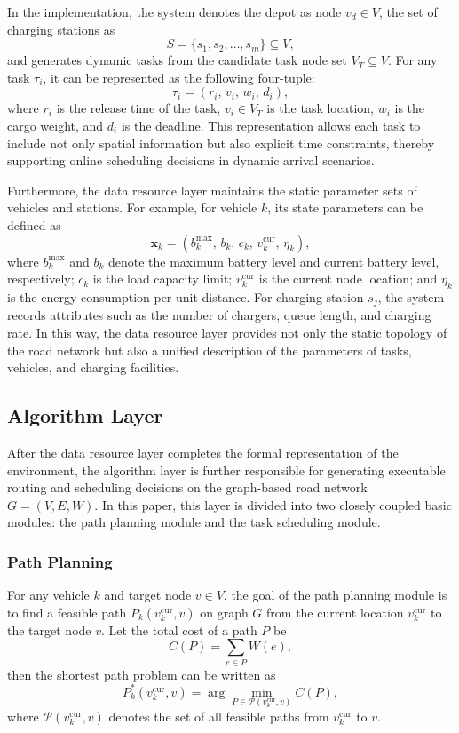 In the implementation, the system denotes the depot as node \(v_d\in V\), the set of charging stations as
\[
S=\{s_1,s_2,\dots,s_m\}\subseteq V,
\]
and generates dynamic tasks from the candidate task node set \(V_T\subseteq V\). For any task \(\tau_i\), it can be represented as the following four-tuple:
\[
\tau_i=(r_i,\, v_i,\, w_i,\, d_i),
\]
where \(r_i\) is the release time of the task, \(v_i\in V_T\) is the task location, \(w_i\) is the cargo weight, and \(d_i\) is the deadline. This representation allows each task to include not only spatial information but also explicit time constraints, thereby supporting online scheduling decisions in dynamic arrival scenarios.

Furthermore, the data resource layer maintains the static parameter sets of vehicles and stations. For example, for vehicle \(k\), its state parameters can be defined as
\[
\mathbf{x}_k=(b_k^{\max},\, b_k,\, c_k,\, v_k^{\text{cur}},\, \eta_k),
\]
where \(b_k^{\max}\) and \(b_k\) denote the maximum battery level and current battery level, respectively; \(c_k\) is the load capacity limit; \(v_k^{\text{cur}}\) is the current node location; and \(\eta_k\) is the energy consumption per unit distance. For charging station \(s_j\), the system records attributes such as the number of chargers, queue length, and charging rate. In this way, the data resource layer provides not only the static topology of the road network but also a unified description of the parameters of tasks, vehicles, and charging facilities.



\subsection{Algorithm Layer}
After the data resource layer completes the formal representation of the environment, the algorithm layer is further responsible for generating executable routing and scheduling decisions on the graph-based road network \(G=(V,E,W)\). In this paper, this layer is divided into two closely coupled basic modules: the path planning module and the task scheduling module.
\subsubsection{Path Planning}
For any vehicle \(k\) and target node \(v\in V\), the goal of the path planning module is to find a feasible path \(P_k(v_k^{\text{cur}}, v)\) on graph \(G\) from the current location \(v_k^{\text{cur}}\) to the target node \(v\). Let the total cost of a path \(P\) be
\[
C(P)=\sum_{e\in P} W(e),
\]
then the shortest path problem can be written as
\[
P_k^*(v_k^{\text{cur}}, v)=\arg\min_{P\in \mathcal{P}(v_k^{\text{cur}}, v)} C(P),
\]
where \(\mathcal{P}(v_k^{\text{cur}}, v)\) denotes the set of all feasible paths from \(v_k^{\text{cur}}\) to \(v\).

